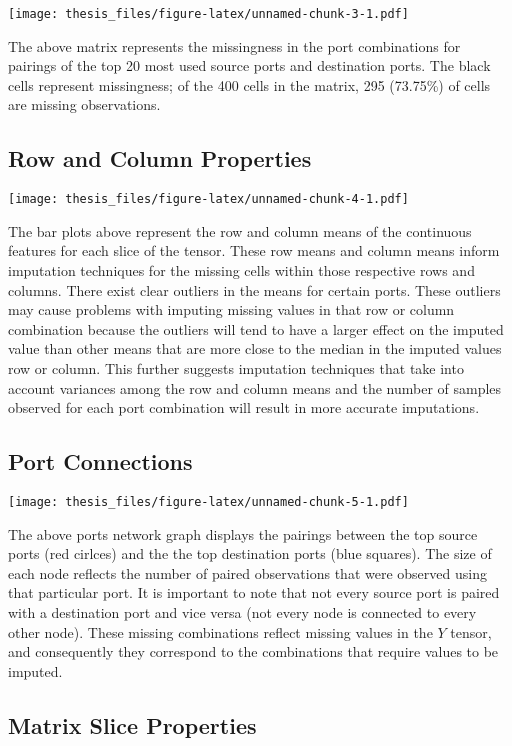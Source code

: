 \documentclass[12pt,twoside]{dukestatscithesis}
\theoremstyle{definition}
\theoremstyle{definition}
\theoremstyle{definition}
\theoremstyle{remark}
\begin{document}
\texttt{[image: thesis\_files/figure-latex/unnamed-chunk-3-1.pdf]}

The above matrix represents the missingness in the port combinations for
pairings of the top 20 most used source ports and destination ports. The
black cells represent missingness; of the 400 cells in the matrix, 295
(73.75\%) of cells are missing observations.

\subsection{Row and Column Properties}\label{row-and-column-properties}

\texttt{[image: thesis\_files/figure-latex/unnamed-chunk-4-1.pdf]}

The bar plots above represent the row and column means of the continuous
features for each slice of the tensor. These row means and column means
inform imputation techniques for the missing cells within those
respective rows and columns. There exist clear outliers in the means for
certain ports. These outliers may cause problems with imputing missing
values in that row or column combination because the outliers will tend
to have a larger effect on the imputed value than other means that are
more close to the median in the imputed values row or column. This
further suggests imputation techniques that take into account variances
among the row and column means and the number of samples observed for
each port combination will result in more accurate imputations.

\subsection{Port Connections}\label{port-connections}

\texttt{[image: thesis\_files/figure-latex/unnamed-chunk-5-1.pdf]}

The above ports network graph displays the pairings between the top
source ports (red cirlces) and the the top destination ports (blue
squares). The size of each node reflects the number of paired
observations that were observed using that particular port. It is
important to note that not every source port is paired with a
destination port and vice versa (not every node is connected to every
other node). These missing combinations reflect missing values in the
\(Y\) tensor, and consequently they correspond to the combinations that
require values to be imputed.

\subsection{Matrix Slice Properties}\label{matrix-slice-properties}
\end{document}
